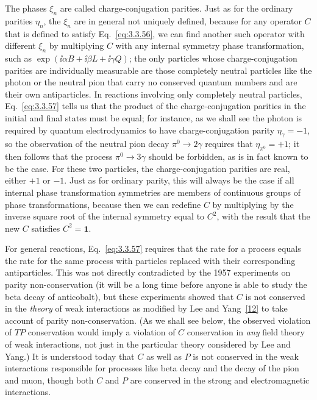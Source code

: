 The phases $\xi_n$ are called charge-conjugation parities. Just as for the ordinary
parities $\eta_n$, the $\xi_n$ are in general not uniquely defined, because for any
operator $C$ that is defined to satisfy Eq.~\eqref{eq:3.3.56}, we can find another such
operator with different $\xi_n$ by multiplying $C$ with any internal symmetry
phase transformation, such as $\exp(\ii\alpha B+\ii\beta L+\ii\gamma Q)$; the only
particles whose charge-conjugation parities are individually measurable are those
completely neutral particles like the photon or the neutral pion that carry no
conserved quantum numbers and are their own antiparticles. In reactions involving
only completely neutral particles, Eq.~\eqref{eq:3.3.57} tells us that the product of the
charge-conjugation parities in the initial and final states must be equal; for
instance, as we shall see the photon is required by quantum electrodynamics to have
charge-conjugation parity $\eta_\gamma=-1$, so the observation of the neutral pion
decay $\pi^0\to2\gamma$ requires that $\eta_{\pi^0}=+1$; it then follows that the
process $\pi^0\to3\gamma$ should be forbidden, as is in fact known to be the case.
For these two particles, the charge-conjugation parities are real, either $+1$ or
$-1$. Just as for ordinary parity, this will always be the case if all internal
phase transformation symmetries are members of continuous groups of phase
transformations, because then we can redefine $C$ by multiplying by the inverse
square root of the internal symmetry equal to $C^2$, with the result that the new
$C$ satisfies $C^2=\mathbf{1}$.

For general reactions, Eq.~\eqref{eq:3.3.57} requires that the rate for a process equals the
rate for the same process with particles replaced with their corresponding
antiparticles. This was not directly contradicted by the 1957 experiments on parity
non-conservation (it will be a long time before anyone is able to study the beta
decay of anticobalt), but these experiments showed that $C$ is not conserved in the
\textit{theory} of weak interactions as modified by Lee and Yang~\hyperref[ref:3.12]{[12]} to take
account of parity non-conservation. (As we shall see below, the observed violation
of $TP$ conservation would imply a violation of $C$ conservation in \textit{any}
field theory of weak interactions, not just in the particular theory considered by
Lee and Yang.) It is understood today that $C$ as well as $P$ is not conserved in
the weak interactions responsible for processes like beta decay and the decay of
the pion and muon, though both $C$ and $P$ are conserved in the strong and
electromagnetic interactions.

